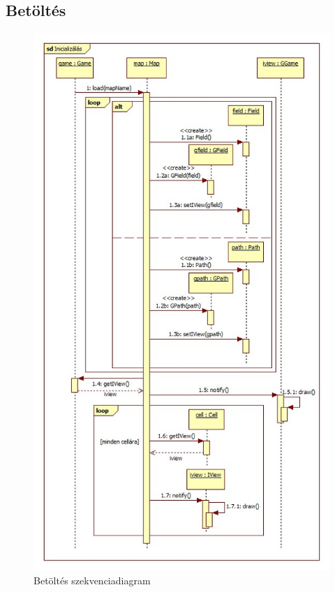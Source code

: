 \subsection{Betöltés}
\begin{figure}[H]
\begin{center}
\includegraphics[width=13cm]{chapters/chapter11/images/Betoltes.jpg}
\caption{Betöltés szekvenciadiagram}
\label{fig:Betoltes}
\end{center}
\end{figure}

